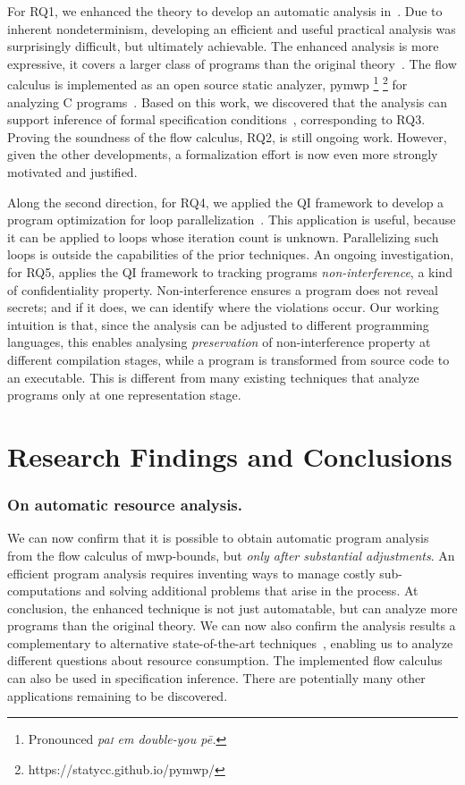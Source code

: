 For RQ1, we enhanced the theory to develop an automatic analysis in~\cite{aubert20222,aubert2023b,rusch2025}.
Due to inherent nondeterminism, developing an efficient and useful practical analysis was surprisingly difficult, but ultimately achievable.
The enhanced analysis is more expressive,
\ie it covers a larger class of programs than the original theory~\cite{rusch2025}.
The flow calculus is implemented as an open source static analyzer, pymwp%
\footnote{Pronounced \emph{pa\textsc{i} em double-you p\={e}.}}
\footnote{https://statycc.github.io/pymwp/}{ }for analyzing C programs~\cite{aubert2023b}.
Based on this work, we discovered that the analysis can support
inference of formal specification conditions~\cite{rusch2025}, corresponding to RQ3.
Proving the soundness of the flow calculus, RQ2, is still ongoing work.
However, given the other developments, a formalization effort is now even more strongly motivated and justified.

Along the second direction, for RQ4, we applied the QI framework to develop a program optimization for loop parallelization~\cite{aubert20232}.
This application is useful, because it can be applied to loops whose iteration count is unknown.
Parallelizing such loops is outside the capabilities of the prior techniques.
An ongoing investigation, for RQ5, applies the QI framework to tracking programs \emph{non\hyp{}interference}, a kind of confidentiality property.
Non-interference ensures a program does not reveal secrets;
and if it does, we can identify where the violations occur.
Our working intuition is that, since the analysis can be adjusted to different programming languages,
this enables analysing \emph{preservation} of non-interference property at different compilation stages,
while a program is transformed from source code to an executable.
This is different from many existing techniques that analyze programs only at one representation stage.

\section{Research Findings and Conclusions}
\label{aicc-discussion}

\subsubsection*{On automatic resource analysis.}
We can now confirm that it is possible to obtain automatic program analysis from the flow calculus of mwp-bounds, but \emph{only after substantial adjustments}.
An efficient program analysis requires inventing ways to manage costly sub-computations and solving additional problems that arise in the process.
At conclusion, the enhanced technique is not just automatable, but can analyze more programs than the original theory.
We can now also confirm the analysis results a complementary to alternative state-of-the-art techniques~\cite[p. 5]{aubert2023b}, enabling us to analyze different questions about resource consumption.
The implemented flow calculus can also be used in specification inference.
There are potentially many other applications remaining to be discovered.

